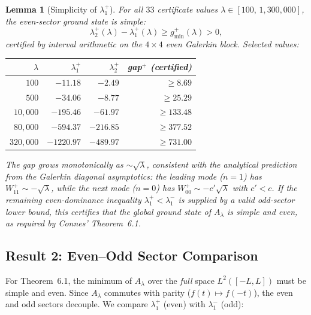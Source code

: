 \documentclass[12pt,a4paper]{article}
\newtheorem{lemma}[theorem]{Lemma}
\theoremstyle{definition}
\theoremstyle{remark}
\begin{document}
\begin{lemma}[Simplicity of $\lambda_1^+$]
\label{lem:simplicity}
For all $33$ certificate values $\lambda \in [100,\, 1{,}300{,}000]$, the even-sector ground state is simple:
\[
  \lambda_2^+(\lambda) - \lambda_1^+(\lambda) \geq g_{\min}^+(\lambda) > 0,
\]
certified by interval arithmetic on the $4 \times 4$ even Galerkin block. Selected values:

\medskip
\begin{center}
\renewcommand{\arraystretch}{1.15}
\begin{tabular}{r|r|r|r}
$\lambda$ & $\lambda_1^+$ & $\lambda_2^+$ & gap$^+$ (certified) \\\hline
$100$ & $-11.18$ & $-2.49$ & $\geq 8.69$ \\
$500$ & $-34.06$ & $-8.77$ & $\geq 25.29$ \\
$10{,}000$ & $-195.46$ & $-61.97$ & $\geq 133.48$ \\
$80{,}000$ & $-594.37$ & $-216.85$ & $\geq 377.52$ \\
$320{,}000$ & $-1220.97$ & $-489.97$ & $\geq 731.00$
\end{tabular}
\end{center}

\medskip\noindent
The gap grows monotonically as $\sim\!\sqrt{\lambda}$, consistent with the analytical prediction from the Galerkin diagonal asymptotics: the leading mode ($n = 1$) has $W_{11}^+ \sim -\sqrt{\lambda}$, while the next mode ($n = 0$) has $W_{00}^+ \sim -c'\sqrt{\lambda}$ with $c' < c$. If the remaining even-dominance inequality $\lambda_1^+ < \lambda_1^-$ is supplied by a valid odd-sector lower bound, this certifies that the global ground state of $A_\lambda$ is simple and even, as required by Connes' Theorem~6.1.
\end{lemma}

\subsection{Result 2: Even--Odd Sector Comparison}

For Theorem~6.1, the minimum of $A_\lambda$ over the \emph{full} space $L^2([-L,L])$ must be simple and even. Since $A_\lambda$ commutes with parity ($f(t)\mapsto f(-t)$), the even and odd sectors decouple. We compare $\lambda_1^+$ (even) with $\lambda_1^-$ (odd):
\end{document}
